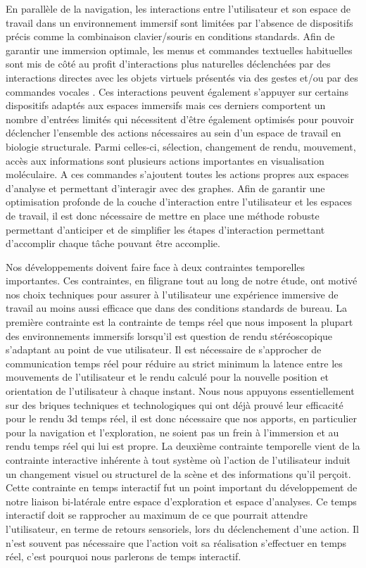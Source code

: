En parallèle de la navigation, les interactions entre l'utilisateur et son espace de travail dans un environnement immersif sont limitées par l'absence de dispositifs précis comme la combinaison clavier/souris en conditions standards. Afin de garantir une immersion optimale, les menus et commandes textuelles habituelles sont mis de côté au profit d'interactions plus naturelles déclenchées par des interactions directes avec les objets virtuels présentés via des gestes et/ou par des commandes vocales \cite{bowman2001design}. Ces interactions peuvent également s'appuyer sur certains dispositifs adaptés aux espaces immersifs mais ces derniers comportent un nombre d'entrées limités qui nécessitent d'être également optimisés pour pouvoir déclencher l'ensemble des actions nécessaires au sein d'un espace de travail en biologie structurale. Parmi celles-ci, sélection, changement de rendu, mouvement, accès aux informations sont plusieurs actions importantes en visualisation moléculaire. A ces commandes s'ajoutent toutes les actions propres aux espaces d'analyse et permettant d'interagir avec des graphes. Afin de garantir une optimisation profonde de la couche d'interaction entre l'utilisateur et les espaces de travail, il est donc nécessaire de mettre en place une méthode robuste permettant d'anticiper et de simplifier les étapes d'interaction permettant d'accomplir chaque tâche pouvant être accomplie. 

Nos développements doivent faire face à deux contraintes temporelles importantes. Ces contraintes, en filigrane tout au long de notre étude, ont motivé nos choix techniques pour assurer à l'utilisateur une expérience immersive de travail au moins aussi efficace que dans des conditions standards de bureau.
La première contrainte est la contrainte de temps réel que nous imposent la plupart des environnements immersifs lorsqu'il est question de rendu stéréoscopique s'adaptant au point de vue utilisateur. Il est nécessaire de s'approcher de communication temps réel pour réduire au strict minimum la latence entre les mouvements de l'utilisateur et le rendu calculé pour la nouvelle position et orientation de l'utilisateur à chaque instant. Nous nous appuyons essentiellement sur des briques techniques et technologiques qui ont déjà prouvé leur efficacité pour le rendu 3d temps réel, il est donc nécessaire que nos apports, en particulier pour la navigation et l'exploration, ne soient pas un frein à l'immersion et au rendu temps réel qui lui est propre.
La deuxième contrainte temporelle vient de la contrainte interactive inhérente à tout système où l'action de l'utilisateur induit un changement visuel ou structurel de la scène et des informations qu'il perçoit. Cette contrainte en temps interactif fut un point important du développement de notre liaison bi-latérale entre espace d'exploration et espace d'analyses. Ce temps interactif doit se rapprocher au maximum de ce que pourrait attendre l'utilisateur, en terme de retours sensoriels, lors du déclenchement d'une action. Il n'est souvent pas nécessaire que l'action voit sa réalisation s'effectuer en temps réel, c'est pourquoi nous parlerons de temps interactif.

